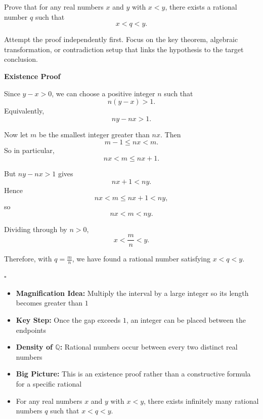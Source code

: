 
\begin{problem}[Density of Q in R]
Prove that for any real numbers $x$ and $y$ with $x < y$, there exists a rational number $q$ such that
\[
x < q < y.
\]
\end{problem}

\begin{hint}
Attempt the proof independently first. Focus on the key theorem, algebraic transformation, or contradiction setup that links the hypothesis to the target conclusion.
\end{hint}

\begin{solution}
\textbf{Existence Proof}

Since $y-x>0$, we can choose a positive integer $n$ such that
\[
n(y-x)>1.
\]
Equivalently,
\[
ny-nx>1.
\]

Now let $m$ be the smallest integer greater than $nx$. Then
\[
m-1 \le nx < m.
\]
So in particular,
\[
nx < m \le nx+1.
\]

But $ny-nx>1$ gives
\[
nx+1<ny.
\]
Hence
\[
nx<m\le nx+1<ny,
\]
so
\[
nx<m<ny.
\]

Dividing through by $n>0$,
\[
x<\frac{m}{n}<y.
\]

Therefore, with $q=\frac{m}{n}$, we have found a rational number satisfying $x<q<y$.

\hfill $\square$
\end{solution}

\begin{takeaways}
\begin{itemize}
\item \textbf{Magnification Idea:} Multiply the interval by a large integer so its length becomes greater than $1$
\item \textbf{Key Step:} Once the gap exceeds $1$, an integer can be placed between the endpoints
\item \textbf{Density of $\mathbb{Q}$:} Rational numbers occur between every two distinct real numbers
\item \textbf{Big Picture:} This is an existence proof rather than a constructive formula for a specific rational
\item For any real numbers $x$ and $y$ with $x < y$, there exists infinitely many rational numbers $q$ such that $x < q < y$.

\end{itemize}
\end{takeaways}
